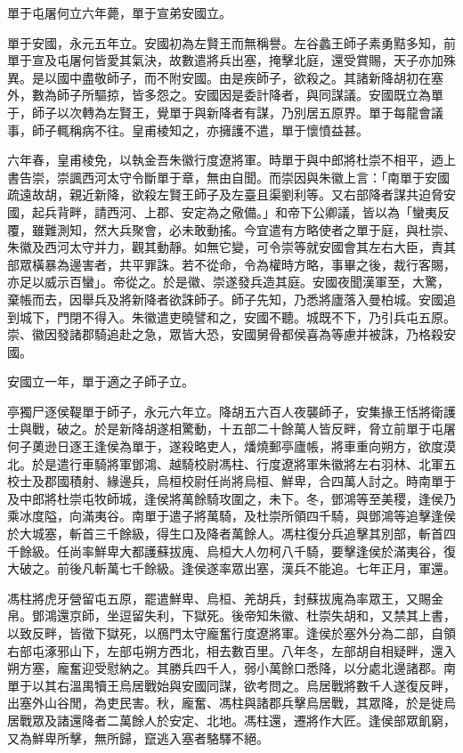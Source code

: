\begin{pinyinscope}
單于屯屠何立六年薨，單于宣弟安國立。

單于安國，永元五年立。安國初為左賢王而無稱譽。左谷蠡王師子素勇黠多知，前單于宣及屯屠何皆愛其氣決，故數遣將兵出塞，掩擊北庭，還受賞賜，天子亦加殊異。是以國中盡敬師子，而不附安國。由是疾師子，欲殺之。其諸新降胡初在塞外，數為師子所驅掠，皆多怨之。安國因是委計降者，與同謀議。安國既立為單于，師子以次轉為左賢王，覺單于與新降者有謀，乃別居五原界。單于每龍會議事，師子輒稱病不往。皇甫棱知之，亦擁護不遣，單于懷憤益甚。

六年春，皇甫棱免，以執金吾朱徽行度遼將軍。時單于與中郎將杜崇不相平，迺上書告崇，崇諷西河太守令斷單于章，無由自聞。而崇因與朱徽上言：「南單于安國疏遠故胡，親近新降，欲殺左賢王師子及左臺且渠劉利等。又右部降者謀共迫脅安國，起兵背畔，請西河、上郡、安定為之儆備。」和帝下公卿議，皆以為「蠻夷反覆，雖難測知，然大兵聚會，必未敢動搖。今宜遣有方略使者之單于庭，與杜崇、朱徽及西河太守并力，觀其動靜。如無它變，可令崇等就安國會其左右大臣，責其部眾橫暴為邊害者，共平罪誅。若不從命，令為權時方略，事畢之後，裁行客賜，亦足以威示百蠻」。帝從之。於是徽、崇遂發兵造其庭。安國夜聞漢軍至，大驚，棄帳而去，因舉兵及將新降者欲誅師子。師子先知，乃悉將廬落入曼柏城。安國追到城下，門閉不得入。朱徽遣吏曉譬和之，安國不聽。城既不下，乃引兵屯五原。崇、徽因發諸郡騎追赴之急，眾皆大恐，安國舅骨都侯喜為等慮并被誅，乃格殺安國。

安國立一年，單于適之子師子立。

亭獨尸逐侯鞮單于師子，永元六年立。降胡五六百人夜襲師子，安集掾王恬將衛護士與戰，破之。於是新降胡遂相驚動，十五部二十餘萬人皆反畔，脅立前單于屯屠何子薁逊日逐王逢侯為單于，遂殺略吏人，燔燒郵亭廬帳，將車重向朔方，欲度漠北。於是遣行車騎將軍鄧鴻、越騎校尉馮柱、行度遼將軍朱徽將左右羽林、北軍五校士及郡國積射、緣邊兵，烏桓校尉任尚將烏桓、鮮卑，合四萬人討之。時南單于及中郎將杜崇屯牧師城，逢侯將萬餘騎攻圍之，未下。冬，鄧鴻等至美稷，逢侯乃乘冰度隘，向滿夷谷。南單于遣子將萬騎，及杜崇所領四千騎，與鄧鴻等追擊逢侯於大城塞，斬首三千餘級，得生口及降者萬餘人。馮柱復分兵追擊其別部，斬首四千餘級。任尚率鮮卑大都護蘇拔廆、烏桓大人勿柯八千騎，要擊逢侯於滿夷谷，復大破之。前後凡斬萬七千餘級。逢侯遂率眾出塞，漢兵不能追。七年正月，軍還。

馮柱將虎牙營留屯五原，罷遣鮮卑、烏桓、羌胡兵，封蘇拔廆為率眾王，又賜金帛。鄧鴻還京師，坐逗留失利，下獄死。後帝知朱徽、杜崇失胡和，又禁其上書，以致反畔，皆徵下獄死，以鴈門太守龐奮行度遼將軍。逢侯於塞外分為二部，自領右部屯涿邪山下，左部屯朔方西北，相去數百里。八年冬，左部胡自相疑畔，還入朔方塞，龐奮迎受慰納之。其勝兵四千人，弱小萬餘口悉降，以分處北邊諸郡。南單于以其右溫禺犢王烏居戰始與安國同謀，欲考問之。烏居戰將數千人遂復反畔，出塞外山谷閒，為吏民害。秋，龐奮、馮柱與諸郡兵擊烏居戰，其眾降，於是徙烏居戰眾及諸還降者二萬餘人於安定、北地。馮柱還，遷將作大匠。逢侯部眾飢窮，又為鮮卑所擊，無所歸，竄逃入塞者駱驛不絕。


\end{pinyinscope}
